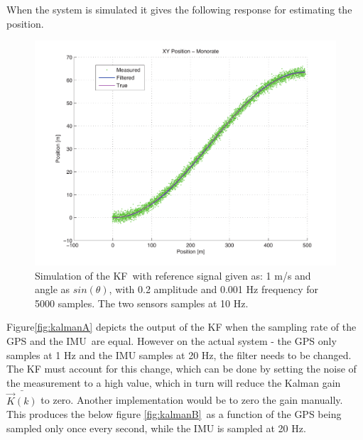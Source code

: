 When the system is simulated it gives the following response for estimating the position.
\begin{figure}[htbp]
	\centering
	\includegraphics[width=\textwidth]{img/kalmana}
	\caption{Simulation of the \ac{KF} with reference signal given as: 1 m/s and angle as $sin(\theta)$, with 0.2 amplitude and 0.001 Hz frequency for 5000 samples. The two sensors samples at 10 Hz. }
	\label{fig:kalmanA}
\end{figure}

Figure\vref{fig:kalmanA} depicts the output of the \ac{KF} when the sampling rate of the \ac{GPS} and the \ac{IMU} are equal. However on the actual system - the \ac{GPS} only samples at 1 Hz and the \ac{IMU} samples at 20 Hz, the filter needs to be changed. The \ac{KF} must account for this change, which can be done by setting the noise of the measurement to a high value, which in turn will reduce the Kalman gain $\bar{\vec{K}(k)}$ to zero. Another implementation would be to zero the gain manually. This produces the below figure \vref{fig:kalmanB} as a function of the \ac{GPS} being sampled only once every second, while the \ac{IMU} is sampled at 20 Hz. 

